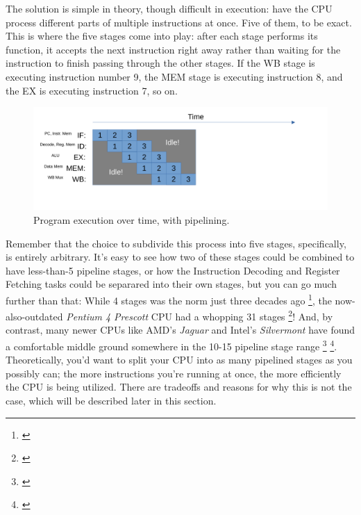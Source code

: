 \documentclass[12pt,twoside]{reedthesis}
\begin{document}
\break

The solution is simple in theory, though difficult in execution: have the CPU process different parts of multiple instructions at once. Five of them, to be exact. This is where the five stages come into play:
after each stage performs its function, it accepts the next instruction right away rather than waiting for the instruction to finish passing through the other stages.
If the WB stage is executing instruction number 9, the MEM stage is executing instruction 8, and the EX is executing instruction 7, so on.


\begin{figure}[h!]

	\centering
	\includegraphics[scale=0.6]{pipelinedsteps.pdf}
	\caption{Program execution over time, with pipelining.}
	\label{pipelined-steps}
\end{figure}

Remember that the choice to subdivide this process into five stages, specifically, is entirely arbitrary. It's easy to see how two of these stages could be combined to have less-than-5 pipeline stages, or how the Instruction Decoding and Register Fetching tasks could be separared into their own stages, but you can go much further than that: While 4 stages was the norm just three decades ago \footnote{\cite{denning}}, the now-also-outdated \textit{Pentium 4 Prescott} CPU had a whopping 31 stages \footnote{\cite{shimpi}}!
And, by contrast, many newer CPUs like AMD's \textit{Jaguar} and Intel's \textit{Silvermont} have found a comfortable middle ground somewhere in the 10-15 pipeline stage range \footnote{\cite{kanter1}} \footnote{\cite{kanter2}}.  Theoretically, you'd want to split your CPU into as many pipelined stages as you possibly can; the more instructions you're running at once, the more efficiently the CPU is being utilized. There are tradeoffs and reasons for why this is not the case, which will be described later in this section.
\end{document}

